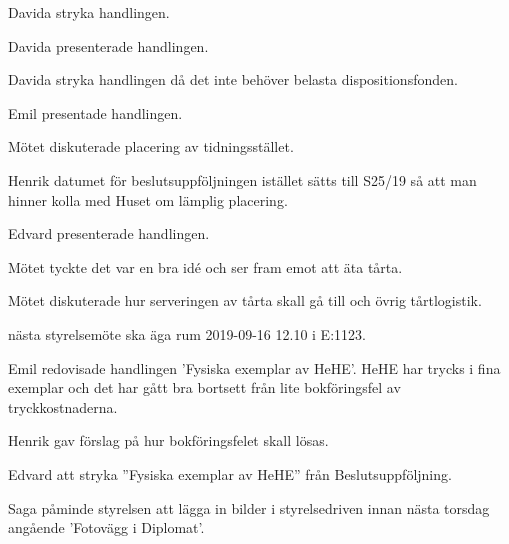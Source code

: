 \documentclass[10pt]{article}
\begin{document}
\begin{paragrafer}
Davida \ypa stryka handlingen. 

\Mbaby


Davida presenterade handlingen. 

Davida \ypa stryka handlingen då det inte behöver belasta dispositionsfonden.

\Mbaby


Emil presentade handlingen. 

Mötet diskuterade placering av tidningsstället. 

Henrik \ypa datumet för beslutsuppföljningen istället sätts till S25/19 så att man hinner kolla med Huset om lämplig placering. 

\Mbabay

Edvard presenterade handlingen. 

Mötet tyckte det var en bra idé och ser fram emot att äta tårta.

Mötet diskuterade hur serveringen av tårta skall gå till och övrig tårtlogistik. 

\Mbabay


\Mba nästa styrelsemöte ska äga rum 2019-09-16 12.10 i E:1123.


Emil redovisade handlingen 'Fysiska exemplar av HeHE'. HeHE har trycks i fina exemplar och det har gått bra bortsett från lite bokföringsfel av tryckkostnaderna. 

Henrik gav förslag på hur bokföringsfelet skall lösas.  



Edvard \ypa att stryka ''Fysiska exemplar av HeHE'' från Beslutsuppföljning. 

\Mbaby

Saga påminde styrelsen att lägga in bilder i styrelsedriven innan nästa torsdag angående 'Fotovägg i Diplomat'.




\end{paragrafer}
\end{document}
